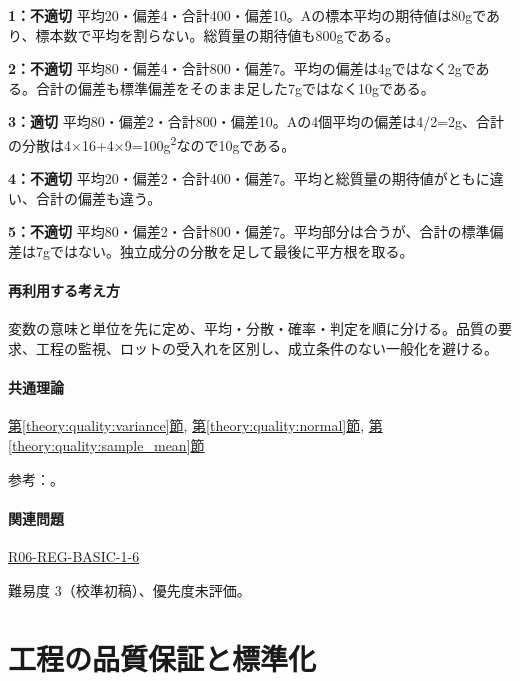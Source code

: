 \noindent\textbf{1：不適切} 平均20・偏差4・合計400・偏差10。Aの標本平均の期待値は80gであり、標本数で平均を割らない。総質量の期待値も800gである。\par

\noindent\textbf{2：不適切} 平均80・偏差4・合計800・偏差7。平均の偏差は4gではなく2gである。合計の偏差も標準偏差をそのまま足した7gではなく10gである。\par

\noindent\textbf{3：適切} 平均80・偏差2・合計800・偏差10。Aの4個平均の偏差は4/2=\allowbreak{}2g、合計の分散は4×16+4×9=\allowbreak{}100g\textsuperscript{2}なので10gである。\par

\noindent\textbf{4：不適切} 平均20・偏差2・合計400・偏差7。平均と総質量の期待値がともに違い、合計の偏差も違う。\par

\noindent\textbf{5：不適切} 平均80・偏差2・合計800・偏差7。平均部分は合うが、合計の標準偏差は7gではない。独立成分の分散を足して最後に平方根を取る。\par

\paragraph{再利用する考え方} 変数の意味と単位を先に定め、平均・分散・確率・判定を順に分ける。品質の要求、工程の監視、ロットの受入れを区別し、成立条件のない一般化を避ける。

\paragraph{共通理論} \hyperref[theory:quality:variance]{第\ref*{theory:quality:variance}節}, \hyperref[theory:quality:normal]{第\ref*{theory:quality:normal}節}, \hyperref[theory:quality:sample_mean]{第\ref*{theory:quality:sample_mean}節}

\par 参考：\cite{stat_nist_normal,stat_psu_linear}。

\paragraph{関連問題} \hyperref[q:r06-reg-basic-1-6]{R06-REG-BASIC-1-6}

\par 難易度 3（校準初稿）、優先度未評価。

\section{工程の品質保証と標準化}

